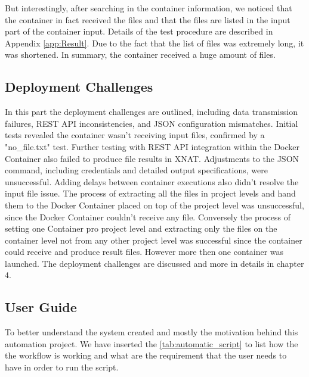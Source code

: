 \normalsize
But interestingly, after searching in the container information, we noticed that the container in fact received the files and that the files are listed in the input part of the container input. 
Details of the test procedure are described in Appendix 
\autoref{app:Result}. Due to the fact that the list of files was extremely long, it was shortened. In summary, the container received a huge amount of files.
\normalsize
\subsection{Deployment Challenges}
 In this part the deployment challenges are outlined, including data transmission failures, REST API inconsistencies, and JSON configuration mismatches. Initial tests revealed the container wasn't receiving input files, confirmed by a "no\_file.txt" test. Further testing with REST API integration within the Docker Container also failed to produce  file results in XNAT. Adjustments to the JSON command, including credentials and detailed output specifications, were unsuccessful. Adding delays between container executions also didn't resolve the input file issue.
 The process of extracting all the files in project levels and hand them to the Docker Container placed on top of the project level was unsuccessful, since the Docker Container couldn't receive any file. Conversely the process of setting one Container pro project level and extracting only the files on the container level not from any other project level was successful since the container could receive and produce result files. However more then one container was launched.
 The deployment challenges are discussed and more in details in chapter 4. 


\normalsize



\subsection{User Guide}
To better understand the system created and mostly the motivation behind this automation project. We have inserted the \autoref{tab:automatic_script} to list how the the workflow is working and what are the requirement that the user needs to have in order to run the script. 

